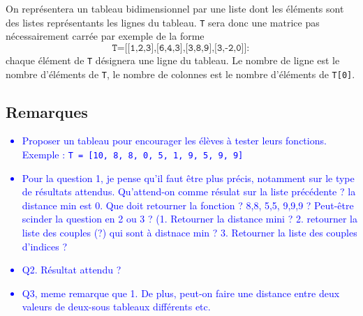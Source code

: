 





On représentera un tableau bidimensionnel par une liste dont les éléments sont des listes représentants les lignes du tableau. \texttt{T} sera donc une matrice pas nécessairement carrée par exemple de la forme $$\texttt{T=[[1,2,3],[6,4,3],[3,8,9],[3,-2,0]]}:$$ chaque élément de \texttt{T} désignera une ligne du tableau. Le nombre de ligne est le nombre d'éléments de \texttt{T}, le nombre de colonnes est le nombre d'éléments de \texttt{T[0]}.


\subsection*{Remarques}
\textcolor{blue}{
\begin{itemize}
\item Proposer un tableau pour encourager les élèves à tester leurs fonctions. Exemple : \texttt{T =  [10, 8, 8, 0, 5, 1, 9, 5, 9, 9]}
\item Pour la question 1, je pense qu'il faut être plus précis, notamment sur le type de résultats attendus. Qu'attend-on comme résulat sur la liste précédente ? la distance min est 0. Que doit retourner la fonction ? 8,8, 5,5, 9,9,9 ?
Peut-être scinder la question en 2 ou 3 ? (1. Retourner la distance mini ? 2. retourner la liste des couples (?) qui sont à distnace min ? 3. Retourner la liste des couples d'indices ?
\item Q2. Résultat attendu ?
\item Q3, meme remarque que 1. De plus, peut-on faire une distance entre deux valeurs de deux-sous tableaux différents etc.
\end{itemize}}
